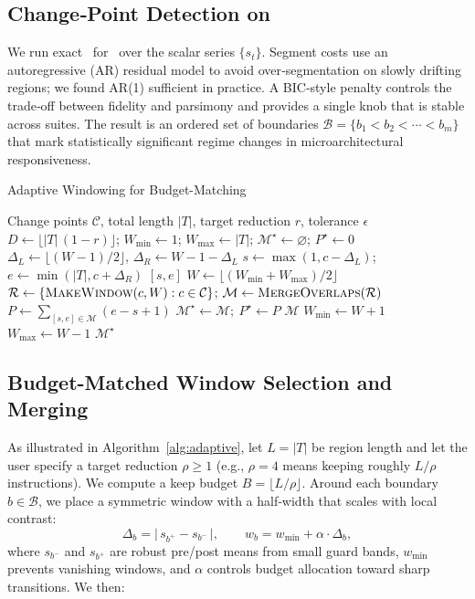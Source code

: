 \subsection{Change‑Point Detection on \pts}
We run exact \pelt\ for \cpd\ over the scalar series \(\{s_t\}\). Segment costs use an autoregressive (AR) residual model to avoid over‑segmentation on slowly drifting regions; we found AR(1) sufficient in practice. A BIC‑style penalty controls the trade‑off between fidelity and parsimony and provides a single knob that is stable across suites. The result is an ordered set of boundaries \(\mathcal{B}=\{b_1<b_2<\cdots<b_m\}\) that mark statistically significant regime changes in microarchitectural responsiveness.
\begin{algorithm}[t]
\caption{Adaptive Windowing for Budget-Matching}
\label{alg:adaptive}
\small
\begin{algorithmic}[1]
\Require Change points \(\mathcal{C}\), total length \(|T|\), target reduction \(r\), tolerance \(\epsilon\)
\State \(D\gets \lfloor |T|\,(1-r)\rfloor\); \(W_{\min}\gets 1\); \(W_{\max}\gets |T|\); \(\mathcal{M}^\star\gets\varnothing\); \(P^\star\gets 0\)
  \State \(\Delta_L\gets\lfloor(W-1)/2\rfloor\), \(\Delta_R\gets W-1-\Delta_L\)
  \State \(s\gets\max(1,c-\Delta_L)\); \(e\gets\min(|T|,c+\Delta_R)\)
  \State \Return \([s,e]\)
\EndFunction
{}
  \State \(W\gets\lfloor(W_{\min}+W_{\max})/2\rfloor\)
  \State \(\mathcal{R}\gets \{\textsc{MakeWindow}(c,W):c\in\mathcal{C}\}\); \(\mathcal{M}\gets \textsc{MergeOverlaps}(\mathcal{R})\)
  \State \(P\gets\sum_{[s,e]\in\mathcal{M}}(e-s+1)\)
   \(\mathcal{M}^\star\gets\mathcal{M};\ P^\star\gets P\) \EndIf
   \Return \(\mathcal{M}\) \EndIf
   \State \(W_{\min}\gets W+1\) \Else \State \(W_{\max}\gets W-1\) \EndIf
\EndWhile
\State \Return \(\mathcal{M}^\star\) 
\end{algorithmic}
\end{algorithm}
\subsection{Budget-Matched Window Selection and Merging}
As illustrated in Algorithm~\ref{alg:adaptive}, let \(L=|T|\) be region length and let the user specify a target reduction \(\rho\!\ge\!1\) (e.g., \(\rho\!=\!4\) means keeping roughly \(L/\rho\) instructions). We compute a keep budget \(B=\lfloor L/\rho \rfloor\). Around each boundary \(b\in\mathcal{B}\), we place a symmetric window with a half‑width that scales with local contrast:
\[
\Delta_b=\big|\,s_{b^+}-s_{b^-}\,\big|,\qquad
w_b = w_{\min} + \alpha\cdot \Delta_b,
\]
where \(s_{b^-}\) and \(s_{b^+}\) are robust pre/post means from small guard bands, \(w_{\min}\) prevents vanishing windows, and \(\alpha\) controls budget allocation toward sharp transitions. We then:

